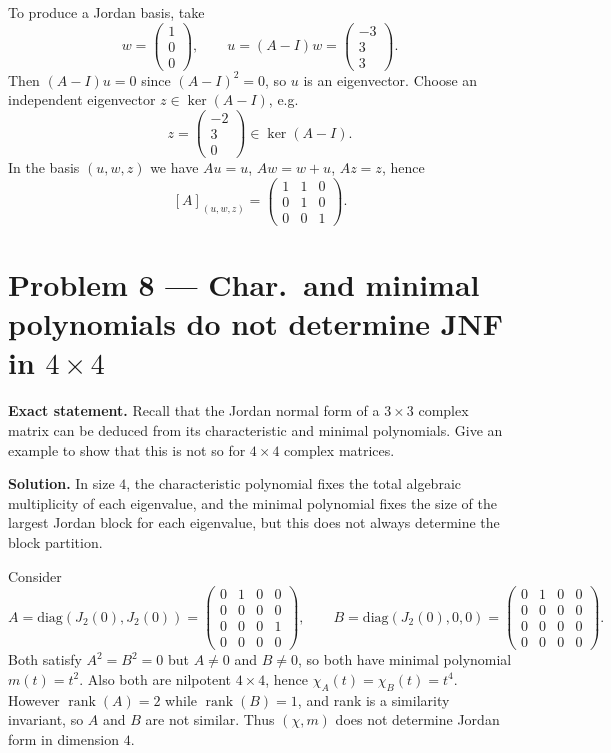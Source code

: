 \documentclass[12pt,a4paper]{article}
\theoremstyle{plain}
\theoremstyle{definition}      %
\begin{document}
To produce a Jordan basis, take
\[
w=\begin{pmatrix}1\\0\\0\end{pmatrix},\qquad
u=(A-I)w=\begin{pmatrix}-3\\3\\3\end{pmatrix}.
\]
Then $(A-I)u=0$ since $(A-I)^2=0$, so $u$ is an eigenvector.
Choose an independent eigenvector $z\in\ker(A-I)$, e.g.
\[
z=\begin{pmatrix}-2\\3\\0\end{pmatrix}\in\ker(A-I).
\]
In the basis $(u,w,z)$ we have $Au=u$, $Aw=w+u$, $Az=z$, hence
\[
[A]_{(u,w,z)}=\begin{pmatrix}1&1&0\\0&1&0\\0&0&1\end{pmatrix}.
\]

\section*{Problem 8 — Char.\ and minimal polynomials do not determine JNF in $4\times 4$}

\textbf{Exact statement.}
Recall that the Jordan normal form of a $3\times 3$ complex matrix can be deduced from its characteristic and minimal polynomials.
Give an example to show that this is not so for $4\times 4$ complex matrices.

\textbf{Solution.}
In size $4$, the characteristic polynomial fixes the total algebraic multiplicity of each eigenvalue,
and the minimal polynomial fixes the size of the largest Jordan block for each eigenvalue, but this does not always determine the block partition.

Consider
\[
A=\mathrm{diag}(J_2(0),J_2(0))
=\begin{pmatrix}
	0&1&0&0\\
	0&0&0&0\\
	0&0&0&1\\
	0&0&0&0
\end{pmatrix},
\qquad
B=\mathrm{diag}(J_2(0),0,0)
=\begin{pmatrix}
	0&1&0&0\\
	0&0&0&0\\
	0&0&0&0\\
	0&0&0&0
\end{pmatrix}.
\]
Both satisfy $A^2=B^2=0$ but $A\neq 0$ and $B\neq 0$, so both have minimal polynomial $m(t)=t^2$.
Also both are nilpotent $4\times 4$, hence $\chi_A(t)=\chi_B(t)=t^4$.
However $\operatorname{rank}(A)=2$ while $\operatorname{rank}(B)=1$, and rank is a similarity invariant, so $A$ and $B$ are not similar.
Thus $(\chi,m)$ does not determine Jordan form in dimension $4$.
\end{document}
